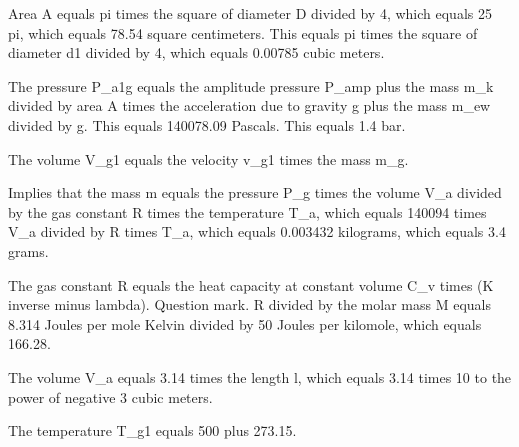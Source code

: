Area A equals pi times the square of diameter D divided by 4, which equals 25 pi, which equals 78.54 square centimeters.
This equals pi times the square of diameter d1 divided by 4, which equals 0.00785 cubic meters.

The pressure P_a1g equals the amplitude pressure P_amp plus the mass m_k divided by area A times the acceleration due to gravity g plus the mass m_ew divided by g.
This equals 140078.09 Pascals.
This equals 1.4 bar.

The volume V_g1 equals the velocity v_g1 times the mass m_g.

Implies that the mass m equals the pressure P_g times the volume V_a divided by the gas constant R times the temperature T_a, which equals 140094 times V_a divided by R times T_a, which equals 0.003432 kilograms, which equals 3.4 grams.

The gas constant R equals the heat capacity at constant volume C_v times (K inverse minus lambda). Question mark. R divided by the molar mass M equals 8.314 Joules per mole Kelvin divided by 50 Joules per kilomole, which equals 166.28.

The volume V_a equals 3.14 times the length l, which equals 3.14 times 10 to the power of negative 3 cubic meters.

The temperature T_g1 equals 500 plus 273.15.